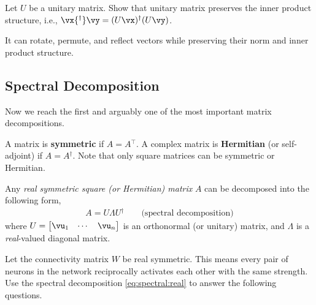 \documentclass[a4paper,11pt]{exam}
\newcounter{ct}
\newcommand{\trp}{{^\top}} %
\newcommand{\ctrp}{{^\dagger}} %
\begin{document}
\begin{questions}

\question Let $U$ be a unitary matrix. Show that unitary matrix preserves the inner product structure, i.e., $\vx\ctrp \vy = (U \vx)\ctrp (U\vy)$.

\begin{tcolorbox}[colback=black!1!,title=Unitary or Orthonormal Matrix]
    It can rotate, permute, and reflect vectors while preserving their norm and inner product structure.
\end{tcolorbox}

\clearpage
\subsection{Spectral Decomposition}
Now we reach the first and arguably one of the most important matrix decompositions.

A matrix is \textbf{symmetric} if $A = A\trp$. A complex matrix is \textbf{Hermitian} (or self-adjoint) if $A = A\ctrp$.
Note that only square matrices can be symmetric or Hermitian.

\begin{tcolorbox}[colback=black!1!,title=Spectral theorem for Hermitian matrices]
Any \textit{real symmetric square (or Hermitian) matrix} $A$ can be decomposed into the following form,
\begin{align}\label{eq:spectral:real}
    A = U \Lambda U\ctrp \qquad \text{(spectral decomposition)}
\end{align}
where $U = \begin{bmatrix}\vu_1 & \cdots & \vu_n \end{bmatrix}$
is an orthonormal (or unitary) matrix, and $\Lambda$ is a \emph{real}-valued diagonal matrix.
\end{tcolorbox}

\question Let the connectivity matrix $W$ be real symmetric. This means every pair of neurons in the network reciprocally activates each other with the same strength.
Use the spectral decomposition \eqref{eq:spectral:real} to answer the following questions.
\begin{parts}

\end{parts}
\end{questions}
\end{document}
